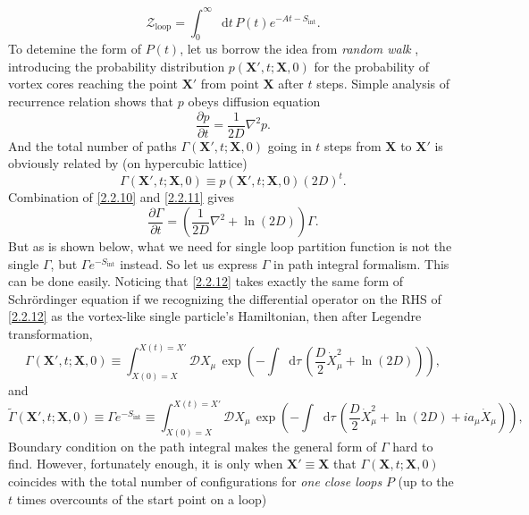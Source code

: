 \documentclass[10pt,nofootinbib]{revtex4}
\newcommand*\dd{\mathop{}\!\mathrm{d}}
\def\Z{\mathcal{Z}}
\numberwithin{equation}{section}
\begin{document}
		\begin{equation}\label{2.2.9}
			\Z_{\text{loop}}=\int_0^\infty\dd t\,P(t)e^{-At-S_{\text{int}}}.
		\end{equation} 
		\indent To detemine the form of $P(t)$, let us borrow the idea from \emph{random walk} \cite{stone1978condensed,itzykson1991statistical}, introducing the probability distribution $p(\bm{X'},t;\bm{X},0)$ for the probability of vortex cores reaching the point $\bm{X'}$ from point $\bm{X}$ after $t$ steps. Simple analysis of recurrence relation shows that $p$ obeys diffusion equation \cite{itzykson1991statistical}
		\begin{equation}\label{2.2.10}
			\dfrac{\partial p}{\partial t}=\dfrac{1}{2D}\nabla^2p.
		\end{equation}
		And the total number of paths $\Gamma(\bm{X'},t;\bm{X},0)$ going in $t$ steps from $\bm{X}$ to $\bm{X'}$ is obviously related by (on hypercubic lattice)
		\begin{equation}\label{2.2.11}
			\Gamma(\bm{X'},t;\bm{X},0)\equiv p(\bm{X'},t;\bm{X},0)(2D)^t.
		\end{equation}
		Combination of \eqref{2.2.10} and \eqref{2.2.11} gives
		\begin{equation}\label{2.2.12}
			\dfrac{\partial \Gamma}{\partial t}=\left(\dfrac{1}{2D}\nabla^2+\ln(2D)\right)\Gamma. 
		\end{equation}
		But as is shown below, what we need for single loop partition function is not the single $\Gamma$, but $\Gamma e^{-S_{\text{int}}}$ instead. So let us express $\Gamma$ in path integral formalism. This can be done easily. Noticing that \eqref{2.2.12} takes exactly the same form of Schr\"{o}rdinger equation if we recognizing the differential operator on the RHS of \eqref{2.2.12} as the vortex-like single particle's Hamiltonian, then after Legendre transformation,
		\begin{equation}\label{2.2.13}
			\Gamma(\bm{X'},t;\bm{X},0)\equiv\int_{X(0)=X}^{X(t)=X'}\mathcal{D}X_\mu\,\exp\left(-\int\dd\tau\,\left(\dfrac{D}{2}\dot{X}_\mu^2+\ln(2D)\right)\right),
		\end{equation}
		and
		\begin{equation}\label{2.2.14}
			\widetilde{\Gamma}(\bm{X'},t;\bm{X},0)\equiv\Gamma e^{-S_{\text{int}}}\equiv\int_{X(0)=X}^{X(t)=X'}\mathcal{D}X_\mu\,\exp\left(-\int\dd\tau\,\left(\dfrac{D}{2}\dot{X}_\mu^2+\ln(2D)+ia_\mu\dot{X}_\mu\right)\right),
		\end{equation}
		Boundary condition on the path integral makes the general form of $\Gamma$ hard to find. However, fortunately enough, it is only when $\bm{X'}\equiv\bm{X}$ that $\Gamma(\bm{X},t;\bm{X},0)$ coincides with the total number of configurations for \emph{one close loops} $P$ (up to the $t$ times overcounts of the start point on a loop)
\end{document}
